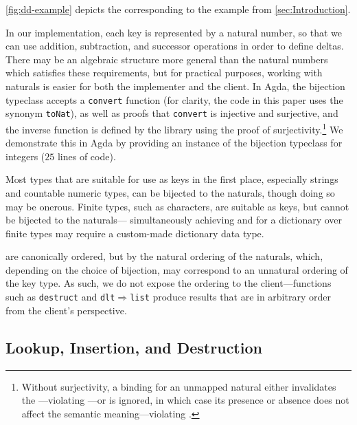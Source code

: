 \autoref{fig:dd-example} depicts the \dd{} corresponding to the example from \autoref{sec:Introduction}.


In our implementation, each key is represented by a natural number, so that we can use addition, subtraction, and successor operations in order to define deltas.
%
There may be an algebraic structure more general than the natural numbers which satisfies these requirements, but for practical purposes, working with naturals
%
is easier for both the implementer and the client. In Agda, the bijection typeclass accepts a \texttt{convert} function (for clarity, the code in this paper uses the synonym \texttt{toNat}), as well as proofs that \texttt{convert}
%
is injective and surjective, and the inverse function is defined by the library using the proof of surjectivity.\footnote{\hspace{0.01in}%
%
Without surjectivity, a binding for an unmapped natural either invalidates the \dd---violating \Total---or is ignored, in which case its presence or absence does not affect the semantic meaning---violating \Extensional.
%
}
%
We demonstrate this in Agda by
%
providing an instance of the bijection typeclass for integers ($25$ lines of code).

Most types that are suitable for use as keys in the first place, especially strings and countable numeric types, can be bijected to the naturals,
%
though doing so may be onerous. Finite types, such as characters, are suitable as keys, but cannot be bijected to the naturals---%
%
simultaneously achieving \Total{} and \Extensional{} for a dictionary over finite types may require a custom-made dictionary data type.

\Ddls{} are canonically ordered, but by the natural ordering of the naturals, which, depending on the choice of bijection, may correspond to an unnatural
%
ordering of the key type. As such, we do not expose the ordering to the client---functions such as \texttt{destruct} and \texttt{dlt$\Rightarrow$list} produce results
%
that are in arbitrary order from the client's perspective.


\subsection{Lookup, Insertion, and Destruction}
\label{sec:DD:basics}

